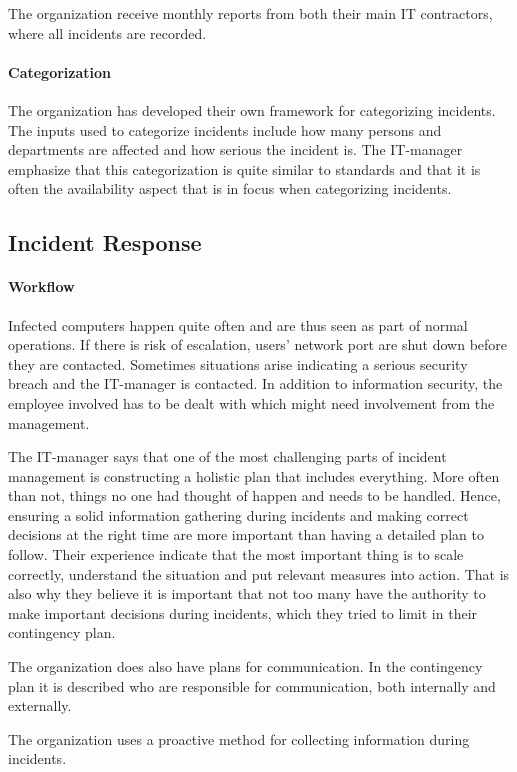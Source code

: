 The organization receive monthly reports from both their main IT contractors, where all incidents are recorded. 


\paragraph{Categorization}
The organization has developed their own framework for categorizing incidents. The inputs used to categorize incidents include how many persons and departments are affected and how serious the incident is. The IT-manager emphasize that this categorization is quite similar to standards and that it is often the availability aspect that is in focus when categorizing incidents.


\subsection{Incident Response}
\paragraph{Workflow}
Infected computers happen quite often and are thus seen as part of normal operations. If there is risk of escalation, users' network port are shut down before they are contacted. Sometimes situations arise indicating a serious security breach and the IT-manager is contacted. In addition to information security, the employee involved has to be dealt with which might need involvement from the management.


The IT-manager says that one of the most challenging parts of incident management is constructing a holistic plan that includes everything. More often than not, things no one had thought of happen and needs to be handled. Hence, ensuring a solid information gathering during incidents and making correct decisions at the right time are more important than having a detailed plan to follow. Their experience indicate that the most important thing is to scale correctly, understand the situation and put relevant measures into action. That is also why they believe it is important that not too many have the authority to make important decisions during incidents, which they tried to limit in their contingency plan.

The organization does also have plans for communication. In the contingency plan it is described who are responsible for communication, both internally and externally. 

The organization uses a proactive method for collecting information during incidents. %

